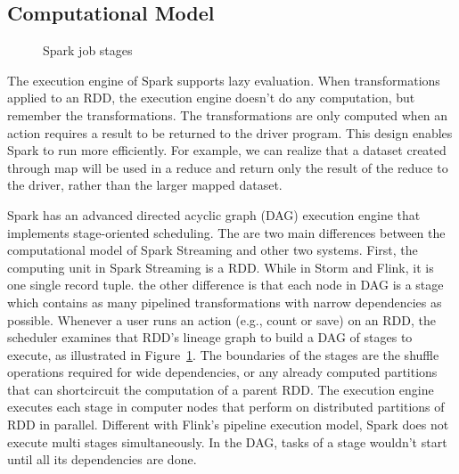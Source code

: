 \subsection{Computational Model}

\begin{figure}
  \begin{center}
   \caption{Spark job stages\cite{zaharia2012resilient}}
   \label{fig:spark_stage}
  \end{center}
\end{figure}

The execution engine of Spark supports lazy evaluation. When transformations applied to an RDD, the execution engine doesn't do any computation, but remember the transformations. The transformations are only computed when an action requires a result to be returned to the driver program. This design enables Spark to run more efficiently. For example, we can realize that a dataset created through map will be used in a reduce and return only the result of the reduce to the driver, rather than the larger mapped dataset.

Spark has an advanced directed acyclic graph (DAG) execution engine that implements stage-oriented scheduling. The are two main differences between the computational model of Spark Streaming and other two systems. First, the computing unit in Spark Streaming is a RDD. While in Storm and Flink, it is one single record tuple. the other difference is that each node in DAG is a stage which contains as many pipelined transformations with narrow dependencies as possible. Whenever a user runs an action (e.g., count or save) on an RDD, the scheduler examines that RDD's lineage graph to build a DAG of stages to execute, as illustrated in Figure~\ref{fig:spark_stage}. The boundaries of the stages are the shuffle operations required for wide dependencies, or any already computed partitions that can shortcircuit the computation of a parent RDD\cite{zaharia2012resilient}. The execution engine executes each stage in computer nodes that perform on distributed partitions of RDD in parallel. Different with Flink's pipeline execution model, Spark does not execute multi stages simultaneously\cite{shi2015clash}. In the DAG, tasks of a stage wouldn't start until all its dependencies are done. 


